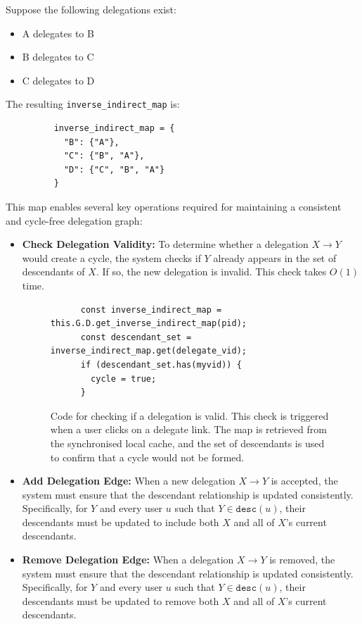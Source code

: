 Suppose the following delegations exist:
\begin{itemize}
    \item A delegates to B
    \item B delegates to C
    \item C delegates to D
\end{itemize}

The resulting \texttt{inverse\_indirect\_map} is:
\begin{figure}[H]
  \centering
  \begin{verbatim}
    inverse_indirect_map = {
      "B": {"A"},
      "C": {"B", "A"},
      "D": {"C", "B", "A"}
    }
    \end{verbatim}
  \label{fig:inverse_indirect_map}
\end{figure}

This map enables several key operations required for maintaining a consistent and cycle-free delegation graph:

\begin{itemize}
  \item \textbf{Check Delegation Validity:} To determine whether a delegation \(X \!\to\! Y\) would create a cycle, the system checks if \(Y\) already appears in the set of descendants of \(X\). If so, the new delegation is invalid. This check takes \(O(1)\) time.
  \begin{figure}[H]
    \centering
    \begin{verbatim}
      const inverse_indirect_map = this.G.D.get_inverse_indirect_map(pid);
      const descendant_set = inverse_indirect_map.get(delegate_vid);
      if (descendant_set.has(myvid)) {
        cycle = true;
      }
    \end{verbatim}
    \caption{Code for checking if a delegation is valid. This check is triggered when a user clicks on a delegate link. The map is retrieved from the synchronised local cache, and the set of descendants is used to confirm that a cycle would not be formed.}
  \end{figure}

  \item \textbf{Add Delegation Edge:} When a new delegation \(X \to Y\) is accepted, the system must ensure that the descendant relationship is updated consistently. Specifically, for $Y$ and every user \(u\) such that \(Y \in \texttt{desc}(u)\), their descendants must be updated to include both \(X\) and all of \(X\)'s current descendants.

  \item \textbf{Remove Delegation Edge:} When a delegation \(X \!\to\! Y\) is removed, the system must ensure that the descendant relationship is updated consistently. Specifically, for $Y$ and every user \(u\) such that \(Y \in \texttt{desc}(u)\), their descendants must be updated to remove both \(X\) and all of \(X\)'s current descendants.
\end{itemize}

